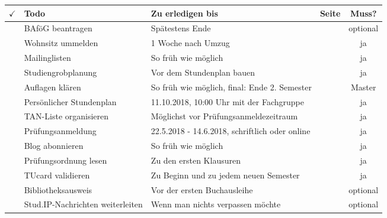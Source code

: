 
\begin{center}
\begin{tabularx}{\textwidth}{|p{3mm}|X|p{7.4cm}|c|c|}
\hline $\checkmark$ 
       & \textbf{Todo}             & \textbf{Zu erledigen bis}                                  & \textbf{Seite}               & \textbf{Muss?} \\ 
\hline & BAföG beantragen          & Spätestens Ende \iftoggle{winter}{Oktober}{April}          & \pageref{todobafoeg}         & optional \\ 
\hline & Wohnsitz ummelden         & 1 Woche nach Umzug                                         & \pageref{todoummelden}       & ja \\
\hline & Mailinglisten             & So früh wie möglich                                        & \pageref{mailinglisten}      & ja \\ 
\hline & Studiengrobplanung        & Vor dem Stundenplan bauen                                  & \pageref{grob}               & ja \\
\hline & Auflagen klären           & So früh wie möglich, final: Ende 2. Semester               & \pageref{auflagen}           & Master \\ 
\hline & Persönlicher Stundenplan  & 11.10.2018, 10:00 Uhr mit der Fachgruppe                   & \pageref{masterstundenplan}  & ja \\ 
\hline & TAN-Liste organisieren    & Möglichst vor Prüfungsanmeldezeitraum                      & \pageref{todoanmeldung}      & ja \\ 
\hline & Prüfungsanmeldung         & 22.5.2018 - 14.6.2018, schriftlich oder online             & \pageref{todoanmeldung}      & ja \\ 
\hline & Blog abonnieren           & So früh wie möglich                                        & \pageref{fachgruppe}         & ja \\ 
\hline & Prüfungsordnung lesen     & Zu den ersten Klausuren                                    & \pageref{po}                 & ja \\ 
\hline & TUcard validieren         & Zu Beginn und zu jedem neuen Semester                      & \pageref{tucard}             & ja \\
\hline & Bibliotheksausweis        & Vor der ersten Buchausleihe                                & \pageref{todobib}            & optional \\
\hline & Stud.IP-Nachrichten weiterleiten  & Wenn man nichts verpassen möchte         & \pageref{studipfwd}            & optional \\
\hline
\end{tabularx} 
\end{center}
